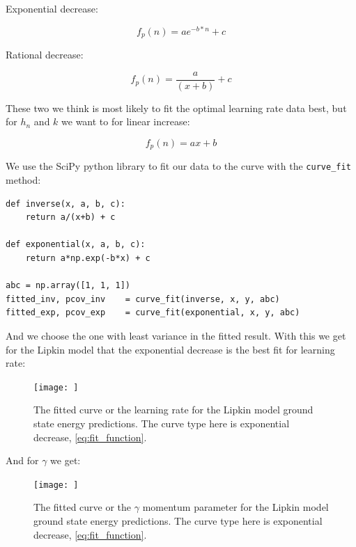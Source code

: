 \vspace{\baselineskip}

Exponential decrease:

\begin{equation}
  f_p(n) = a e^{-b*n} + c
  \label{eq:fit_function}
\end{equation}

\vspace{\baselineskip}


Rational decrease:

\begin{equation}
  f_p(n) = \frac{a}{(x+b)} + c
  \label{eq:ratioanl_decrease}
\end{equation}

These two we think is most likely to fit the optimal learning rate data best, but for $h_n$ and $k$ we want to for linear increase:

\begin{equation}
  f_p(n) = ax + b
  \label{eq:linear_increase}
\end{equation}

We use the SciPy\cite{2020SciPy-NMeth} python library to fit our data to the curve with the \texttt{curve_fit} method:

\begin{verbatim}
def inverse(x, a, b, c):
    return a/(x+b) + c

def exponential(x, a, b, c):
    return a*np.exp(-b*x) + c

abc = np.array([1, 1, 1])
fitted_inv, pcov_inv    = curve_fit(inverse, x, y, abc)
fitted_exp, pcov_exp    = curve_fit(exponential, x, y, abc)
\end{verbatim}

And we choose the one with least variance in the fitted result. With this we get for the Lipkin model that the exponential decrease is the best fit for learning rate:

\begin{figure}[H]
  \begin{center}
    \texttt{[image: ]}
  \end{center}
  \caption{The fitted curve or the learning rate for the Lipkin model ground state energy predictions. The curve type here is exponential decrease, \ref{eq:fit_function}.}\label{fig:lipkin_imp_fit_lr}
\end{figure}

And for $\gamma$ we get:

\begin{figure}[H]
  \begin{center}
    \texttt{[image: ]}
  \end{center}
  \caption{The fitted curve or the $\gamma$ momentum parameter for the Lipkin model ground state energy predictions. The curve type here is exponential decrease, \ref{eq:fit_function}.}\label{fig:lipkin_imp_fit_gamma}
\end{figure}

